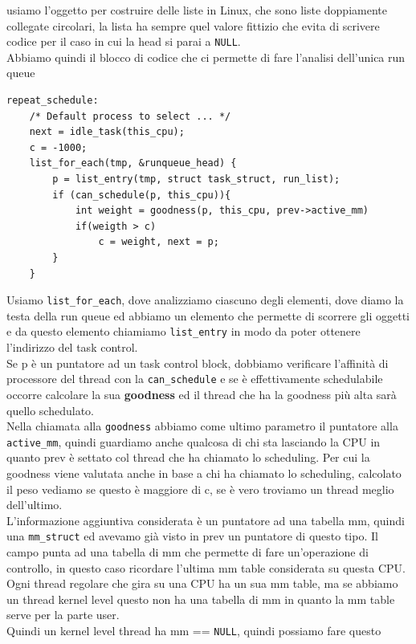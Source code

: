 \documentclass[12pt, oneside]{extbook}
\begin{document}
usiamo l'oggetto per costruire delle liste in Linux, che sono liste doppiamente collegate circolari, la lista ha sempre quel valore fittizio che evita di scrivere codice per il caso in cui la head si parai a \texttt{NULL}.\\Abbiamo quindi il blocco di codice che ci permette di fare l'analisi dell'unica run queue
\begin{lstlisting}
repeat_schedule:
	/* Default process to select ... */
	next = idle_task(this_cpu);
	c = -1000;
	list_for_each(tmp, &runqueue_head) {
		p = list_entry(tmp, struct task_struct, run_list);
		if (can_schedule(p, this_cpu)){
			int weight = goodness(p, this_cpu, prev->active_mm)
			if(weigth > c)
				c = weight, next = p;
		}
	}
\end{lstlisting}
Usiamo \texttt{list\_for\_each}, dove analizziamo ciascuno degli elementi, dove diamo la testa della run queue ed abbiamo un elemento che permette di scorrere gli oggetti e da questo elemento chiamiamo \texttt{list\_entry} in modo da poter ottenere l'indirizzo del task control.\\Se p è un puntatore ad un task control block, dobbiamo verificare l'affinità di processore del thread con la \texttt{can\_schedule} e se è effettivamente schedulabile occorre calcolare la sua \textbf{goodness} ed il thread che ha la goodness più alta sarà quello schedulato.\\Nella chiamata alla \texttt{goodness} abbiamo come ultimo parametro il puntatore alla \texttt{active\_mm}, quindi guardiamo anche qualcosa di chi sta lasciando la CPU in quanto prev è settato col thread che ha chiamato lo scheduling. Per cui la goodness viene valutata anche in base a chi ha chiamato lo scheduling, calcolato il peso vediamo se questo è maggiore di c, se è vero troviamo un thread meglio dell'ultimo.\\L'informazione aggiuntiva considerata è un puntatore ad una tabella mm, quindi una \texttt{mm\_struct} ed avevamo già visto in prev un puntatore di questo tipo. Il campo punta ad una tabella di mm che permette di fare un'operazione di controllo, in questo caso ricordare l'ultima mm table considerata su questa CPU.\\Ogni thread regolare che gira su una CPU ha un sua mm table, ma se abbiamo un thread kernel level questo non ha una tabella di mm in quanto la mm table serve per la parte user.\\Quindi un kernel level thread ha mm == \texttt{NULL}, quindi possiamo fare questo
\end{document}
